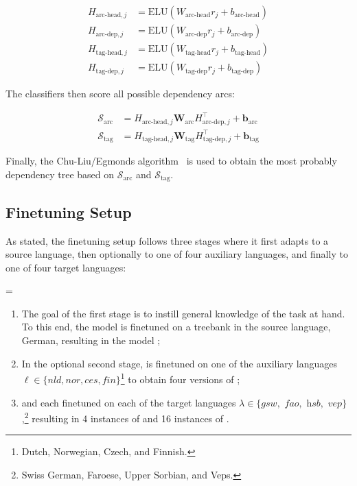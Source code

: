 		\begin{align*}
			H_{\text{arc-head}, j} &= \text{ELU}(W_{\text{arc-head}}r_j + b_{\text{arc-head}}) \\
			H_{\text{arc-dep}, j} &= \text{ELU}(W_{\text{arc-dep}}r_j + b_{\text{arc-dep}}) \\
			H_{\text{tag-head}, j} &= \text{ELU}(W_{\text{tag-head}}r_j + b_{\text{tag-head}}) \\
			H_{\text{tag-dep}, j} &= \text{ELU}(W_{\text{tag-dep}}r_j + b_{\text{tag-dep}})
		\end{align*}

		\noindent The classifiers then score all possible dependency arcs:

		\begin{align*}
			\mathcal{S}_\text{arc} &= H_{\text{arc-head}, j} \mathbf{W}_{\text{arc}} H_{\text{arc-dep}, j}^{\top} + \mathbf{b}_{\text{arc}} \\
			\mathcal{S}_\text{tag} &= H_{\text{tag-head}, j} \mathbf{W}_{\text{tag}} H_{\text{tag-dep}, j}^{\top} + \mathbf{b}_{\text{tag}}
		\end{align*}

		\noindent Finally, the Chu-Liu/Egmonds algorithm~\cite{chu-1965-shortest} is used to obtain the most probably dependency tree based on $\mathcal{S}_\text{arc}$ and $\mathcal{S}_\text{tag}$. 


	\subsection{Finetuning Setup}
	\label{sub:finetuning_setup}
		As stated, the finetuning setup follows three stages where it first adapts to a source language, then optionally to one of four auxiliary languages, and finally to one of four target languages:

		\begin{list}{}{\leftmargin=\parindent {}\parindent}
			\item
			\begin{enumerate}[label=Stage \arabic*:, leftmargin=*, align=left]
			    \item The goal of the first stage is to instill general knowledge of the task at hand. To this end, the model is finetuned on a treebank in the source language, German, resulting in the model ;
			    \item In the optional second stage,  is finetuned on one of the auxiliary languages $\ell \in \{\textit{nld}, \textit{nor}, \textit{ces}, \textit{fin}\}$\footnote{Dutch, Norwegian, Czech, and Finnish.} to obtain four versions of \m{$\ell$};
			    \item {} and each \m{$\ell$} finetuned on each of the target languages $\lambda \in \{\textit{gsw},$ $\textit{fao},$ $\textit{hsb},$ $\textit{vep}\}$,\footnote{Swiss German, Faroese, Upper Sorbian, and Veps.} resulting in 4 instances of  and 16 instances of \m{$\ell$,$\lambda$}.
			\end{enumerate}
		\end{list}

